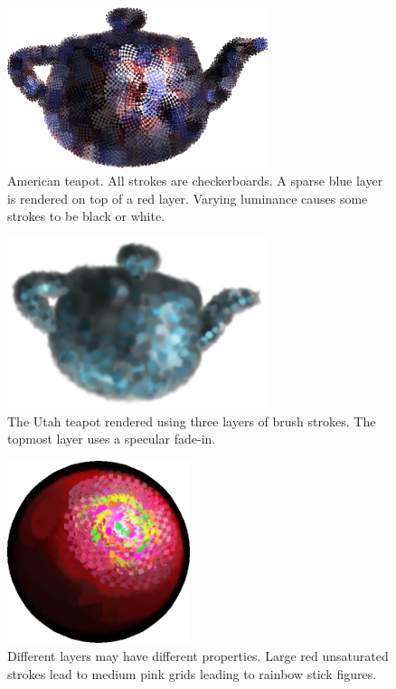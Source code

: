 \documentclass[conference]{acmsiggraph}
\begin{document}
\begin{figure}
  \centering
  \includegraphics[width=3.0in]{images/AmericanTeapot}
  \caption{American teapot. All strokes are checkerboards. A sparse blue layer
           is rendered on top of a red layer. Varying luminance causes some
           strokes to be black or white.}
\end{figure}

\begin{figure}
  \centering
  \includegraphics[width=3.0in]{images/teapot_cropped}
  \caption{The Utah teapot rendered using three layers of brush strokes.
           The topmost layer uses a specular fade-in.}
\end{figure}

\begin{figure}
  \centering
  \includegraphics[width=2.1in]{images/betterMyBall}
  \caption{Different layers may have different properties. Large red
           unsaturated strokes lead to medium pink grids leading to rainbow
           stick figures.}
\end{figure}
\end{document}
